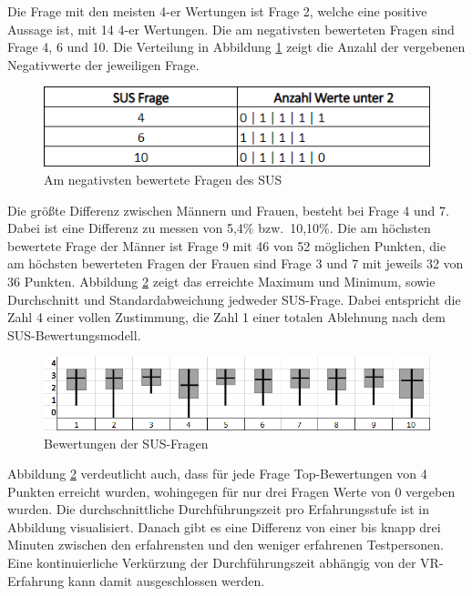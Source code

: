 \noindent Die Frage mit den meisten 4-er Wertungen ist Frage 2, welche eine positive Aussage ist, mit 14 4-er Wertungen. Die am negativsten bewerteten Fragen sind Frage 4, 6 und 10. Die Verteilung in Abbildung \ref{fig:negativstefragen} zeigt die Anzahl der vergebenen Negativwerte der jeweiligen Frage.

\begin{figure}[h]
\captionsetup{width=.7\linewidth}
\includegraphics[scale=0.8]{Bilder/Hauptteil/negativsteFragen}
\centering
\caption{Am negativsten bewertete Fragen des SUS}
\label{fig:negativstefragen}
\end{figure}

\noindent Die größte Differenz zwischen Männern und Frauen, besteht bei Frage 4 und 7. Dabei ist eine Differenz zu messen von 5,4\% bzw.~10,10\%. Die am höchsten bewertete Frage der Männer ist Frage 9 mit 46 von 52 möglichen Punkten, die am höchsten bewerteten Fragen der Frauen sind Frage 3 und 7 mit jeweils 32 von 36 Punkten. Abbildung \ref{fig:fragensusscores} zeigt das erreichte Maximum und Minimum, sowie Durchschnitt und Standardabweichung jedweder SUS-Frage. Dabei entspricht die Zahl 4 einer vollen Zustimmung, die Zahl 1 einer totalen Ablehnung nach dem SUS-Bewertungsmodell.

\begin{figure}[h]
\captionsetup{width=.7\linewidth}
\includegraphics[scale=0.75]{Bilder/Hauptteil/susfragenstandardabweichung}
\centering
\caption{Bewertungen der SUS-Fragen}
\label{fig:fragensusscores}
\end{figure}

\noindent Abbildung \ref{fig:fragensusscores} verdeutlicht auch, dass für jede Frage Top-Bewertungen von 4 Punkten erreicht wurden, wohingegen für nur drei Fragen Werte von 0 vergeben wurden. Die durchschnittliche Durchführungszeit pro Erfahrungsstufe ist in Abbildung  visualisiert. Danach gibt es eine Differenz von einer bis knapp drei Minuten zwischen den erfahrensten und den weniger erfahrenen Testpersonen. Eine kontinuierliche Verkürzung der Durchführungszeit abhängig von der VR-Erfahrung kann damit ausgeschlossen werden.
 
